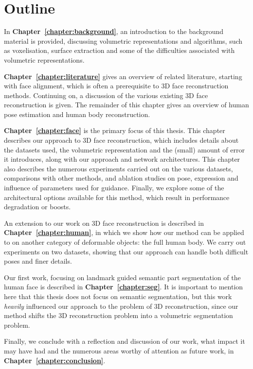 
\section{Outline}

In \textbf{Chapter~\ref{chapter:background}}, an introduction to the
background material is provided, discussing volumetric representations
and algorithms, such as voxelisation, surface extraction and some of
the difficulties associated with volumetric representations.

\textbf{Chapter~\ref{chapter:literature}} gives an overview of related
literature, starting with face alignment, which is often a
prerequisite to 3D face reconstruction methods. Continuing on, a
discussion of the various existing 3D face reconstruction is
given. The remainder of this chapter gives an overview of human pose
estimation and human body reconstruction.

\textbf{Chapter~\ref{chapter:face}} is the primary focus of this
thesis. This chapter describes our approach to 3D face reconstruction,
which includes details about the datasets used, the volumetric
representation and the (small) amount of error it introduces, along
with our approach and network architectures. This chapter also
describes the numerous experiments carried out on the various
datasets, comparisons with other methods, and ablation studies on
pose, expression and influence of parameters used for
guidance. Finally, we explore some of the architectural options
available for this method, which result in performance degradation or
boosts.

An extension to our work on 3D face reconstruction is described in
\textbf{Chapter~\ref{chapter:human}}, in which we show how our method
can be applied to on another category of deformable objects: the full
human body. We carry out experiments on two datasets, showing that our
approach can handle both difficult poses and finer details.

Our first work, focusing on landmark guided semantic part segmentation
of the human face is described in
\textbf{Chapter~\ref{chapter:seg}}. It is important to mention here
that this thesis does not focus on semantic segmentation, but this
work \textit{heavily} influenced our approach to the problem of 3D
reconstruction, since our method shifts the 3D reconstruction problem
into a volumetric segmentation problem.

Finally, we conclude with a reflection and discussion of our work,
what impact it may have had and the numerous areas worthy of attention
as future work, in \textbf{Chapter~\ref{chapter:conclusion}}.

